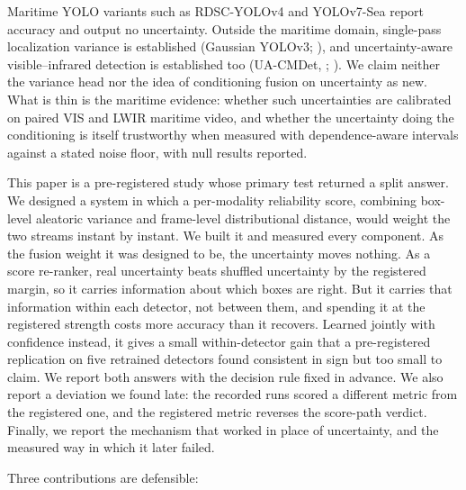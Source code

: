 \documentclass[10pt]{article}
\begin{document}
Maritime YOLO variants such as RDSC-YOLOv4 \citep{liu2021sea} and YOLOv7-Sea \citep{zhao2023yolov7sea} report accuracy and output no uncertainty. Outside the maritime domain, single-pass localization variance is established (Gaussian YOLOv3; \citealp{choi2019gaussian}), and uncertainty-aware visible--infrared detection is established too (UA-CMDet, \citealp{sun2022dronebased}; \citealp{zhao2024uncertaintyaware}). We claim neither the variance head nor the idea of conditioning fusion on uncertainty as new. What is thin is the maritime evidence: whether such uncertainties are calibrated on paired VIS and LWIR maritime video, and whether the uncertainty doing the conditioning is itself trustworthy when measured with dependence-aware intervals against a stated noise floor, with null results reported.

This paper is a pre-registered study whose primary test returned a split answer. We designed a system in which a per-modality reliability score, combining box-level aleatoric variance and frame-level distributional distance, would weight the two streams instant by instant. We built it and measured every component. As the fusion weight it was designed to be, the uncertainty moves nothing. As a score re-ranker, real uncertainty beats shuffled uncertainty by the registered margin, so it carries information about which boxes are right. But it carries that information within each detector, not between them, and spending it at the registered strength costs more accuracy than it recovers. Learned jointly with confidence instead, it gives a small within-detector gain that a pre-registered replication on five retrained detectors found consistent in sign but too small to claim. We report both answers with the decision rule fixed in advance. We also report a deviation we found late: the recorded runs scored a different metric from the registered one, and the registered metric reverses the score-path verdict. Finally, we report the mechanism that worked in place of uncertainty, and the measured way in which it later failed.

Three contributions are defensible:
\end{document}
